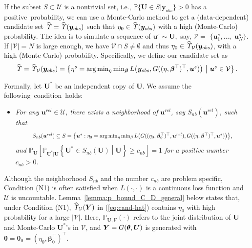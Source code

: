 \documentclass[12pt]{article}
\theoremstyle{shortspace}
\def\*#1{\bm{#1}}
\def\btheta{\mathop{\theta\kern-.45em\hbox{$\theta$}}\nolimits}
\def\P{\mathbb P}
\begin{document}
If the subset $S \subset {\mathcal U}$ is a nontrivial set,
i.e., $\P\big\{\*U \in S \big | \*y_{obs}\big\} > 0$ has a positive~probability, we can use a Monte-Carlo method to get a  (data-dependent) 
candidate set $\widehat {\it \Upsilon} = \widehat {\it  \Upsilon}(\*y_{obs})$
such that $\eta_0 \in \widehat {\it \Upsilon}(\*y_{obs})$ with a high (Monte-Carlo) probability. 
The idea is to simulate a sequence of $\*u^s \sim \*U$,~say, 
${\mathcal V} = $ $\big\{\*u_1^s, \ldots, $ $\*u_N^s \big\}$. If $|{\mathcal V}| = N$ is large enough, we have ${\mathcal V}\cap S \not = \emptyset$ and thus $\eta_0 \in \widehat{\it \Upsilon}_{{\mathcal V}}(\*y_{obs})$, with a high (Monte-Carlo) probability. Specifically, we define our candidate set as
\begin{equation}
\label{eq:cand-hat}
   \widehat {\it \Upsilon} =  \widehat{\it \Upsilon}_{{\mathcal V}}(\*y_{obs}) = \left\{\eta^s = \arg \min\nolimits_{\eta} \min\nolimits_{\*\beta}L\big(\*y_{obs}, G((\eta, \*\beta^\top)^\top, \*u^s)\big) \,\, \big| \,\, \*u^s \in {\mathcal V} \right\}.
\end{equation}

Formally,
let 
$\*U^*$ be an independent copy of $\*U$.
We assume 
the following~condition~holds:

\vspace{-4mm}
\begin{itemize}
    \item[(N1)] 
\it For 
any $\*u^{rel} \in \mathcal U$, there exists a 
neighborhood of $\*u^{rel}$, say $S_{nb}(\*u^{rel})$, 
such that
\begin{equation*}
    \resizebox{.84\hsize}{!}{$S_{nb}(\*u^{rel})\subseteq S =\big\{\*u^*: \eta_0 = \arg \min\nolimits_{\eta} \min\nolimits_{\beta}L\big(G((\eta_0, \*\beta_0^\top)^\top, \*u^{rel}), G((\eta, \*\beta^\top)^\top, \*u^*)\big)\big\}$},
\end{equation*}
and   $\P_{\*U}\left[\P_{\*U^*|\*U}\left\{\*U^* \in S_{nb}(\*U) \middle | \*U\right\}
   \geq c_{nb}\right] = 1$
   for a positive number $c_{nb} > 0$.

\end{itemize}

\vspace{-4mm} 


\noindent
Although the neighborhood $S_{nb}$ and the number $c_{nb}$ are problem specific,  Condition (N1) is often satisfied 
when $L(\cdot, \cdot)$ is a continuous loss function and ${\mathcal U}$ is uncountable. 
Lemma~\ref{lemma:p_bound_C_D_general} below states that, 
under Condition (N1), 
$\widehat{\it \Upsilon}_{{\mathcal V}}(\*Y)$ 
in (\ref{eq:cand-hat}) contains $\eta_0$ with high probability for a large $|\mathcal V|$.  
Here, 
$\P_{\*U, {\mathcal V}}(\cdot)$ refers to the joint distribution of $\*U$ and  Monte-Carlo $\*U^*$'s in ${\mathcal V}$, and $\*Y = G(\btheta, \*U)$ is generated with $\*\theta = \*\theta_0 = (\eta_0, \*\beta_0^\top)^\top.$
\end{document}
